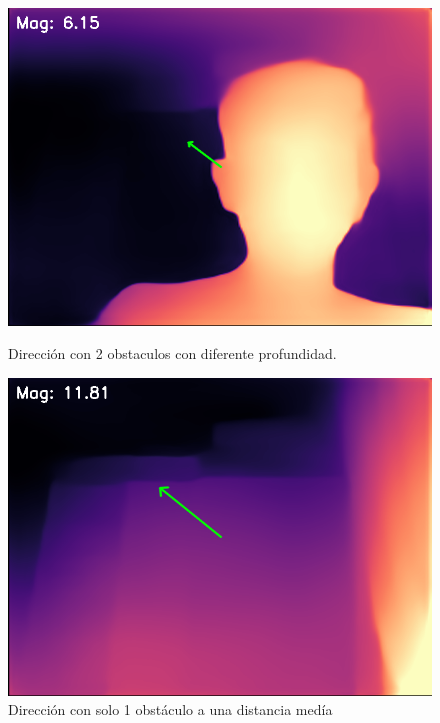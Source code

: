 \begin{figure}[h]
    \centering
    \begin{minipage}{0.49\textwidth}
        \centering
        \includegraphics[width=\linewidth]{images/get_dir_body1.png}
        \caption{Dirección con 2 obstaculos con diferente profundidad.}
        \label{fig:dir_body}
    \end{minipage}
    \hfill
    \begin{minipage}{0.49\textwidth}
        \centering
        \includegraphics[width=\linewidth]{images/get_dir_background2.png}
        \caption{Dirección con solo 1 obstáculo a una distancia medía}
        \label{fig:dir_back}
    \end{minipage}
    

\end{figure}
